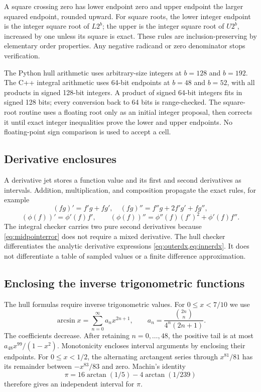 \documentclass[11pt]{article}
\numberwithin{equation}{section}
\theoremstyle{definition}\newtheorem{definition}[theorem]{Definition}
\theoremstyle{remark}\newtheorem{remark}[theorem]{Remark}
\begin{document}
A square crossing zero has lower endpoint zero and upper endpoint the larger
squared endpoint, rounded upward. For square roots, the lower integer
endpoint is the integer square root of $L2^b$; the upper is the integer
square root of $U2^b$, increased by one unless its square is exact.
These rules are inclusion-preserving by elementary order properties.
Any negative radicand or zero denominator stops verification.

The Python hull arithmetic uses arbitrary-size integers at $b=128$ and
$b=192$. The C++ integral arithmetic uses 64-bit endpoints at $b=48$ and
$b=52$, with all products in signed 128-bit integers. A product of signed
64-bit integers fits in signed 128 bits; every conversion back to 64 bits
is range-checked. The square-root routine uses a floating root only as an
initial integer proposal, then corrects it until exact integer inequalities
prove the lower and upper endpoints. No floating-point sign comparison is
used to accept a cell.

\subsection{Derivative enclosures}
A derivative jet stores a function value and its first and second derivatives
as intervals. Addition, multiplication, and composition propagate the exact
rules, for example
\[
 (fg)'=f'g+fg',\quad (fg)''=f''g+2f'g'+fg'',
\]
\[
 (\phi(f))'=\phi'(f)f',\qquad
 (\phi(f))''=\phi''(f)(f')^2+\phi'(f)f''.
\]
The integral checker carries two pure second derivatives because
\cref{eq:midpointerror} does not require a mixed derivative. The hull
checker differentiates the analytic derivative expressions
\cref{eq:outerdx,eq:innerdx}. It does not differentiate a table of sampled
values or a finite difference approximation.

\subsection{Enclosing the inverse trigonometric functions}
The hull formulas require inverse trigonometric values. For $0\le x<7/10$
we use
\[
 \arcsin x=\sum_{n=0}^\infty a_nx^{2n+1},\qquad
 a_n=\frac{\binom{2n}{n}}{4^n(2n+1)}.
\]
The coefficients decrease. After retaining $n=0,\ldots,48$, the positive
tail is at most $a_{48}x^{99}/(1-x^2)$. Monotonicity encloses interval
arguments by enclosing their endpoints. For $0\le x<1/2$, the alternating
arctangent series through $x^{81}/81$ has its remainder between
$-x^{83}/83$ and zero. Machin's identity
\[
 \pi=16\arctan(1/5)-4\arctan(1/239)
\]
therefore gives an independent interval for $\pi$.
\end{document}
